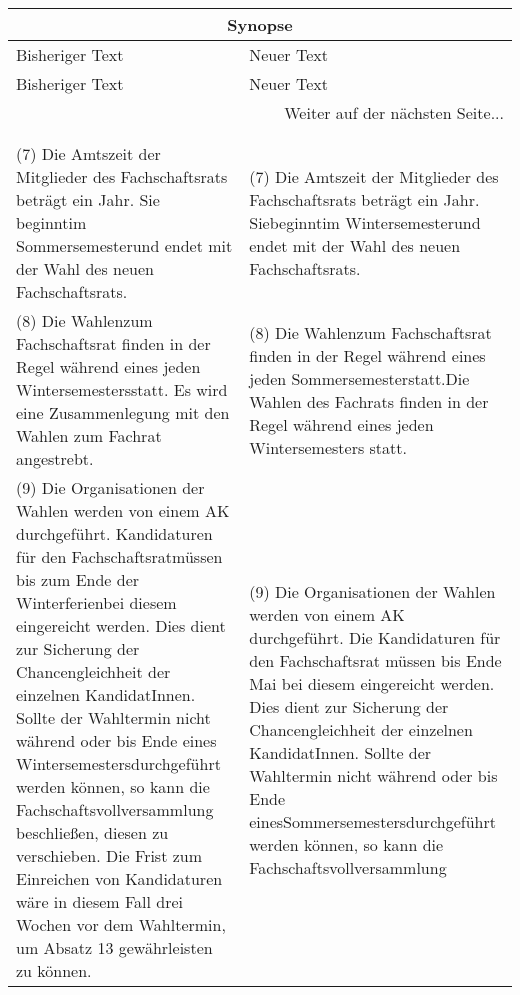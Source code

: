     {\begin{longtable}{|p{7.5cm}|p{7.5cm}|}
        \hline
        \multicolumn{2}{|c|}{Synopse}\\\hline
        Bisheriger Text & Neuer Text \\\hline
        \endfirsthead
        \hline
        Bisheriger Text & Neuer Text \\
        \hline
        \endhead
        \hline
        \multicolumn{2}{|r|}{Weiter auf der nächsten Seite...}\\
        \hline
        \endfoot
        \hline
        \multicolumn{2}{c}{Ende der Synopse} \\
        \endlastfoot
        \multicolumn{2}{|c|}{§3 Fachschaftsrat}\\\hline
        (7) Die Amtszeit der Mitglieder des Fachschaftsrats beträgt ein Jahr. Sie beginntim Sommersemesterund endet mit der
        Wahl des neuen Fachschaftsrats.&
        (7) Die Amtszeit der Mitglieder des Fachschaftsrats beträgt ein Jahr. Siebeginntim Wintersemesterund endet mit der
        Wahl des neuen Fachschaftsrats.\\
        (8) Die Wahlenzum Fachschaftsrat finden in der Regel während eines jeden Wintersemestersstatt. Es wird eine Zusammenlegung
        mit den Wahlen zum Fachrat angestrebt.&
        (8) Die Wahlenzum Fachschaftsrat finden in der Regel während eines jeden Sommersemesterstatt.Die Wahlen des Fachrats
        finden in der Regel während eines jeden Wintersemesters statt.\\
        (9) Die Organisationen der Wahlen werden von einem AK durchgeführt. Kandidaturen für den Fachschaftsratmüssen bis zum 
        Ende der Winterferienbei diesem eingereicht werden. Dies dient zur Sicherung der Chancengleichheit der einzelnen KandidatInnen.
        Sollte der Wahltermin nicht während oder bis Ende eines Wintersemestersdurchgeführt werden können, so kann die
        Fachschaftsvollversammlung beschließen, diesen zu verschieben. Die Frist zum Einreichen von Kandidaturen wäre in diesem
        Fall drei Wochen vor dem Wahltermin, um Absatz 13 gewährleisten zu können.&
        (9) Die Organisationen der Wahlen werden von einem AK durchgeführt. Die Kandidaturen für den Fachschaftsrat müssen bis Ende
        Mai bei diesem eingereicht werden. Dies dient zur Sicherung der Chancengleichheit der einzelnen KandidatInnen. Sollte der
        Wahltermin nicht während oder bis Ende einesSommersemestersdurchgeführt werden können, so kann die Fachschaftsvollversammlung

\end{longtable}}
